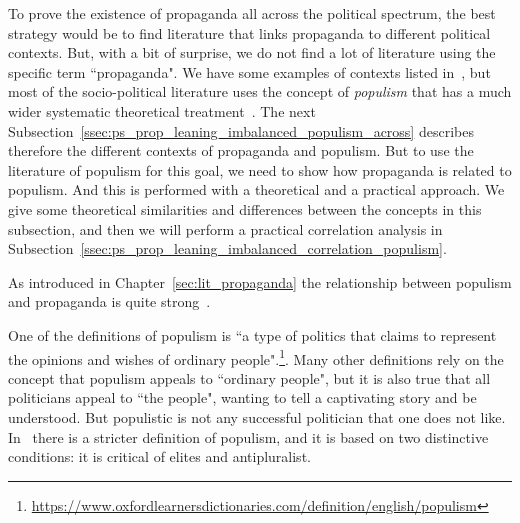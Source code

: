 To prove the existence of propaganda all across the political spectrum, the best strategy would be to find literature that links propaganda to different political contexts. But, with a bit of surprise, we do not find a lot of literature using the specific term ``propaganda". We have some examples of contexts listed in~\citet{woolley2018computational}, but
most of the socio-political literature uses the concept of \emph{\gls{populism}} that has a much wider systematic theoretical treatment~\citep{muller2017populism,jowett2012propaganda,jowett2018propaganda}. %
The next Subsection~\ref{ssec:ps_prop_leaning_imbalanced_populism_across} describes therefore the different contexts of propaganda and populism.
But to use the literature of populism for this goal, we need to show how propaganda is related to populism. And this is performed with a theoretical and a practical approach.
We give some theoretical similarities and differences between the concepts in this subsection, and then we will perform a practical correlation analysis in Subsection~\ref{ssec:ps_prop_leaning_imbalanced_correlation_populism}.



As introduced in Chapter~\ref{sec:lit_propaganda} the relationship between populism and propaganda is quite strong~\citep{tumber2021routledge,pasquino2008populism}.


One of the definitions of populism is ``a type of politics that claims to represent the opinions and wishes of ordinary people".\footnote{\url{https://www.oxfordlearnersdictionaries.com/definition/english/populism}}. Many other definitions rely on the concept that populism appeals to ``ordinary people", but it is also true that all politicians appeal to ``the people", wanting to tell a captivating story and be understood.
But populistic is not any successful politician that one does not like.
In~\citet{muller2017populism} there is a stricter definition of populism, and it is based on %
two distinctive conditions: it is critical of elites and antipluralist.


